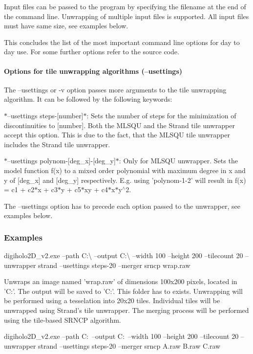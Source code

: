 Input files can be passed to the program by specifying the filename at the end of the command line. Unwrapping of multiple input files is supported. All input files must have same size, see examples below.

This concludes the list of the most important command line options for day to day use. For some further options refer to the source code.

\paragraph*{Options for tile unwrapping algorithms (--usettings)}

The --usettings or -\/v option passes more arguments to the tile unwrapping algorithm. It can be followed by the following keywords\-:


\begin{DoxyItemize}
\item $\ast$--usettings steps-\/\mbox{[}number\mbox{]}$\ast$\-: Sets the number of steps for the minimization of discontinuities to \mbox{[}number\mbox{]}. Both the M\-L\-S\-Q\-U and the Strand tile unwrapper accept this option. This is due to the fact, that the M\-L\-S\-Q\-U tile unwrapper includes the Strand tile unwrapper.
\item $\ast$--usettings polynom-\/\mbox{[}deg\-\_\-x\mbox{]}-\/\mbox{[}deg\-\_\-y\mbox{]}$\ast$\-: Only for M\-L\-S\-Q\-U unwrapper. Sets the model function f(x) to a mixed order polynomial with maximum degree in x and y of \mbox{[}deg\-\_\-x\mbox{]} and \mbox{[}deg\-\_\-y\mbox{]} respectively. E.\-g. using 'polynom-\/1-\/2' will result in f(x) = c1 + c2$\ast$x + c3$\ast$y + c5$\ast$xy + c4$\ast$x$\ast$y$^\wedge$2.
\end{DoxyItemize}

The --usettings option has to precede each option passed to the unwrapper, see examples below.

\subsubsection*{Examples}

digiholo2\-D\-\_\-v2.\-exe --path C\-:\textbackslash{} --output C\-:\textbackslash{} --width 100 --height 200 --tilecount 20 --unwrapper strand --usettings steps-\/20 --merger srncp wrap.\-raw

Unwraps an image named 'wrap.\-raw' of dimensions 100x200 pixels, located in 'C\-:'. The output will be saved to 'C\-:'. This folder has to exists. Unwrapping will be performed using a tesselation into 20x20 tiles. Individual tiles will be unwrapped using Strand's tile unwrapper. The merging process will be performed using the tile-\/based S\-R\-N\-C\-P algorithm. \begin{DoxyVerb}digiholo2D_v2.exe --path C:\ --output C:\outputfolder\ --width 100 --height 200 --tilecount 20 --unwrapper strand --usettings steps-20 --merger srncp A.raw B.raw C.raw
\end{DoxyVerb}


